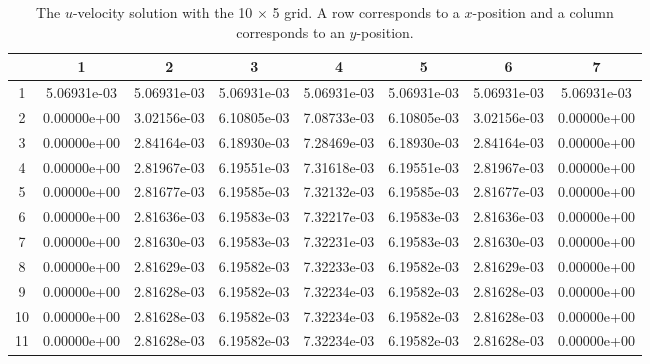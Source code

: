 \documentclass{article}
\begin{document}
\def\arraystretch{1.3}
\begin{table}[H]
	\scriptsize
	\centering
	\caption{The $u$-velocity solution with the 10 $\times$ 5 grid. A row corresponds to a $x$-position and a column corresponds to an $y$-position.}
	\vspace{0.2cm}
	\begin{tabular}{c|S|S|S|S|S|S|S}
		& {1} & {2} & {3} & {4} & {5} & {6} & {7} \\
		 & 5.06931e-03 & 5.06931e-03 & 5.06931e-03 & 5.06931e-03 & 5.06931e-03 & 5.06931e-03 & 5.06931e-03 \\
        2 & 0.00000e+00 & 3.02156e-03 & 6.10805e-03 & 7.08733e-03 & 6.10805e-03 & 3.02156e-03 & 0.00000e+00 \\
        3 & 0.00000e+00 & 2.84164e-03 & 6.18930e-03 & 7.28469e-03 & 6.18930e-03 & 2.84164e-03 & 0.00000e+00 \\
        4 & 0.00000e+00 & 2.81967e-03 & 6.19551e-03 & 7.31618e-03 & 6.19551e-03 & 2.81967e-03 & 0.00000e+00 \\
        5 & 0.00000e+00 & 2.81677e-03 & 6.19585e-03 & 7.32132e-03 & 6.19585e-03 & 2.81677e-03 & 0.00000e+00 \\
        6 & 0.00000e+00 & 2.81636e-03 & 6.19583e-03 & 7.32217e-03 & 6.19583e-03 & 2.81636e-03 & 0.00000e+00 \\
        7 & 0.00000e+00 & 2.81630e-03 & 6.19583e-03 & 7.32231e-03 & 6.19583e-03 & 2.81630e-03 & 0.00000e+00 \\
        8 & 0.00000e+00 & 2.81629e-03 & 6.19582e-03 & 7.32233e-03 & 6.19582e-03 & 2.81629e-03 & 0.00000e+00 \\
        9 & 0.00000e+00 & 2.81628e-03 & 6.19582e-03 & 7.32234e-03 & 6.19582e-03 & 2.81628e-03 & 0.00000e+00 \\
        10 & 0.00000e+00 & 2.81628e-03 & 6.19582e-03 & 7.32234e-03 & 6.19582e-03 & 2.81628e-03 & 0.00000e+00 \\
        11 & 0.00000e+00 & 2.81628e-03 & 6.19582e-03 & 7.32234e-03 & 6.19582e-03 & 2.81628e-03 & 0.00000e+00 \\
	\end{tabular}
	\label{table:coarse-u}
\end{table}
\end{document}
